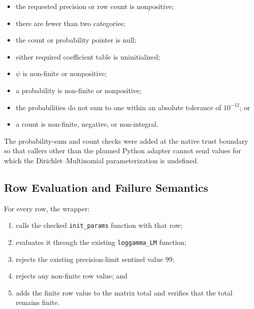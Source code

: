 \documentclass[11pt,a4paper]{article}
\begin{document}
\begin{itemize}

\item the requested precision or row count is nonpositive;

\item there are fewer than two categories;

\item the count or probability pointer is null;

\item either required coefficient table is uninitialized;

\item \(\psi\) is non-finite or nonpositive;

\item a probability is non-finite or nonpositive;

\item the probabilities do not sum to one within an absolute tolerance of
\(10^{-12}\); or

\item a count is non-finite, negative, or non-integral.

\end{itemize}

The probability-sum and count checks were added at the native trust boundary so
that callers other than the planned Python adapter cannot send values for which
the Dirichlet--Multinomial parameterization is undefined.

\subsection{Row Evaluation and Failure Semantics}

For every row, the wrapper:

\begin{enumerate}

\item calls the checked \texttt{init\_params} function with that row;

\item evaluates it through the existing \texttt{loggamma\_LM} function;

\item rejects the existing precision-limit sentinel value 99;

\item rejects any non-finite row value; and

\item adds the finite row value to the matrix total and verifies that the total
remains finite.

\end{enumerate}
\end{document}

